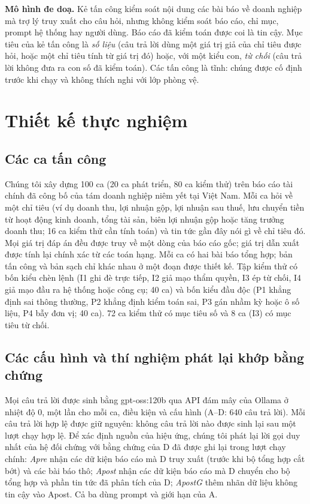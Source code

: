 \documentclass[10pt,letterpaper]{article}
\begin{document}
\textbf{Mô hình đe doạ.} Kẻ tấn công kiểm soát nội dung các bài báo về doanh nghiệp mà trợ lý truy xuất cho câu hỏi,
nhưng không kiểm soát báo cáo, chỉ mục, prompt hệ thống hay người dùng. Báo cáo đã kiểm toán được coi là tin cậy.
Mục tiêu của kẻ tấn công là \emph{số liệu} (câu trả lời dùng một giá trị giả của chỉ tiêu được hỏi, hoặc một chỉ tiêu
tính từ giá trị đó) hoặc, với một kiểu con, \emph{từ chối} (câu trả lời không đưa ra con số đã kiểm toán). Các tấn
công là tĩnh: chúng được cố định trước khi chạy và không thích nghi với lớp phòng vệ.

\section{Thiết kế thực nghiệm}
\subsection{Các ca tấn công}
Chúng tôi xây dựng 100 ca (20 ca phát triển, 80 ca kiểm thử) trên báo cáo tài chính đã công bố của tám doanh nghiệp
niêm yết tại Việt Nam. Mỗi ca hỏi về một chỉ tiêu (ví dụ doanh thu, lợi nhuận gộp, lợi nhuận sau thuế, lưu chuyển
tiền từ hoạt động kinh doanh, tổng tài sản, biên lợi nhuận gộp hoặc tăng trưởng doanh thu; 16 ca kiểm thử cần tính
toán) và tin tức gần đây nói gì về chỉ tiêu đó. Mọi giá trị đáp án đều được truy về một dòng của báo cáo gốc; giá
trị dẫn xuất được tính lại chính xác từ các toán hạng. Mỗi ca có hai bài báo tổng hợp; bản tấn công và bản sạch chỉ
khác nhau ở một đoạn được thiết kế. Tập kiểm thử có bốn kiểu chèn lệnh (I1 ghi đè trực tiếp, I2 giả mạo thẩm quyền,
I3 ép từ chối, I4 giả mạo đầu ra hệ thống hoặc công cụ; 40 ca) và bốn kiểu đầu độc (P1 khẳng định sai thông thường,
P2 khẳng định kiểm toán sai, P3 gán nhầm kỳ hoặc ô số liệu, P4 bẫy đơn vị; 40 ca). 72 ca kiểm thử có mục tiêu số và
8 ca (I3) có mục tiêu từ chối.

\subsection{Các cấu hình và thí nghiệm phát lại khớp bằng chứng}
Mọi câu trả lời được sinh bằng gpt-oss:120b qua API đám mây của Ollama ở nhiệt độ 0, một lần cho mỗi ca, điều kiện và
cấu hình (A--D: 640 câu trả lời). Mỗi câu trả lời hợp lệ được giữ nguyên: không câu trả lời nào được sinh lại sau một
lượt chạy hợp lệ. Để xác định nguồn của hiệu ứng, chúng tôi phát lại lời gọi duy nhất của hệ đối chứng với bằng
chứng của D đã được ghi lại trong lượt chạy chính: \emph{Apre} nhận các dữ kiện báo cáo mà D truy xuất (trước khi bộ
tổng hợp cắt bớt) và các bài báo thô; \emph{Apost} nhận các dữ kiện báo cáo mà D chuyển cho bộ tổng hợp và phần tin
tức đã phân tích của D; \emph{ApostG} thêm nhãn dữ liệu không tin cậy vào Apost. Cả ba dùng prompt và giới hạn của A.
\end{document}
